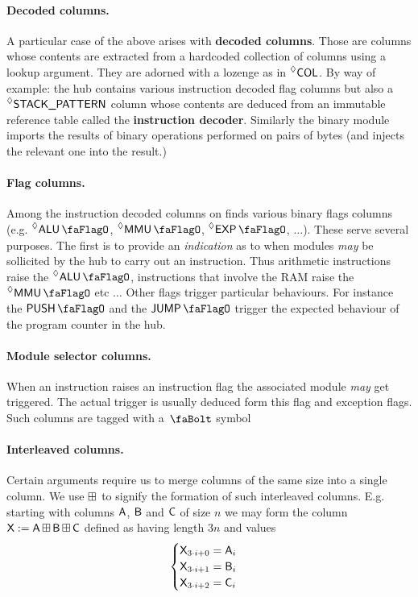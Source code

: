 \paragraph{Decoded columns.} A particular case of the above arises with \textbf{decoded columns}. Those are columns whose contents are extracted from a hardcoded collection of columns using a lookup argument. They are adorned with a lozenge as in $\prescript{\lozenge}{}{\textsf{COL}}$. By way of example: the hub contains various instruction decoded flag columns but also a $\prescript{\lozenge}{}{\textsf{STACK\_PATTERN}}$ column whose contents are deduced from an immutable reference table called the \textbf{instruction decoder}. Similarly the binary module imports the results of binary operations performed on pairs of bytes (and injects the relevant one into the result.)

\paragraph{Flag columns.} Among the instruction decoded columns on finds various binary flags columns (e.g. $\decAluFlag$, $\decMmuFlag$, $\decExpFlag$, $\dots{}$). These serve several purposes. The first is to provide an \emph{indication} as to when modules \emph{may} be sollicited by the hub to carry out an instruction. Thus arithmetic instructions raise the $\decAluFlag$, instructions that involve the RAM raise the $\decMmuFlag$ etc $\dots$ Other flags trigger particular behaviours. For instance the $\pushFlag$ and the $\jumpFlag$ trigger the expected behaviour of the program counter in the hub.

\paragraph{Module selector columns.} When an instruction raises an instruction flag the associated module \emph{may} get triggered. The actual trigger is usually deduced form this flag and exception flags. Such columns are tagged with a $\select$ symbol

\paragraph{Interleaved columns.} Certain arguments require us to merge columns of the same size into a single column. We use $\operatorname{\boxplus}$ to signify the formation of such interleaved columns. E.g. starting with columns $\textsf{A}$, $\textsf{B}$ and $\textsf{C}$ of size $n$ we may form the column $\textsf{X} := \textsf{A}\operatorname{\boxplus}\textsf{B}\operatorname{\boxplus}\textsf{C}$ defined as having length $3n$ and values
\[
	\begin{cases}
		\textsf{X}_{3\cdot i + 0} = \textsf{A}_{i} \\
		\textsf{X}_{3\cdot i + 1} = \textsf{B}_{i} \\
		\textsf{X}_{3\cdot i + 2} = \textsf{C}_{i} \\
	\end{cases}
\]

